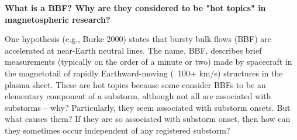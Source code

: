 \textbf{What is a BBF? Why are they considered to be "hot topics" in
magnetospheric research?}

One hypothesis (e.g., Burke 2000) states that bursty bulk flows (BBF)
are accelerated at near-Earth neutral lines. The name, BBF, describes
brief measurements (typically on the order of a minute or two) made by
spacecraft in the magnetotail of rapidly Earthward-moving (~100+ km/s) structures
in the plasma sheet. These are hot topics because some consider BBFs to
be an elementary component of a substorm, although not all are
associated with substorms -- why? Particularly, they seem associated
with substorm onsets. But what causes them? If they are so associated
with substorm onset, then how can they sometimes occur independent of
any registered substorm?



